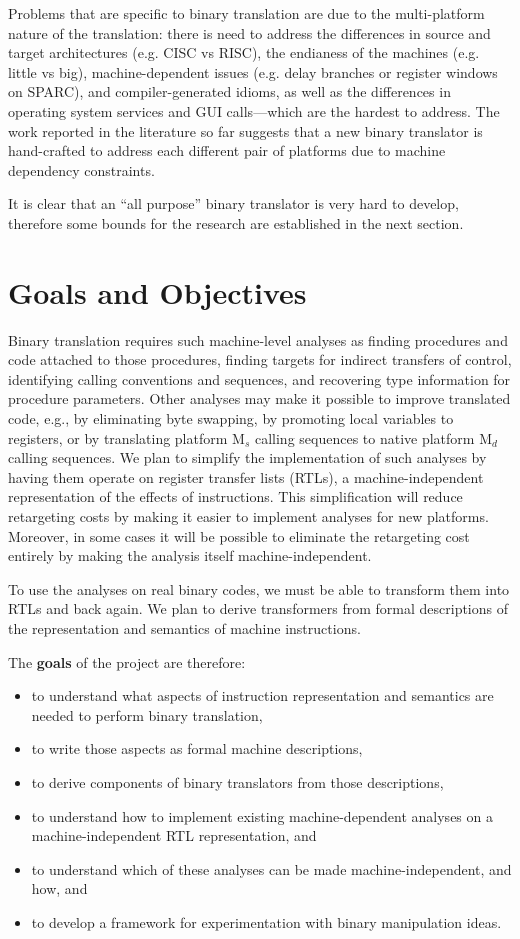 Problems that are specific to binary translation are due to the 
multi-platform nature of the translation: there is need to address
the differences in source and target architectures (e.g. CISC vs RISC),
the endianess of the machines (e.g. little vs big), machine-dependent issues
(e.g. delay branches or register windows on SPARC), and compiler-generated
idioms, as well as the differences in operating system services and
GUI calls---which are the hardest to address.  The work reported in the
literature so far suggests that a new binary translator is hand-crafted
to address each different pair of platforms due to machine dependency
constraints.

It is clear that an ``all purpose'' binary translator is very hard
to develop, therefore some bounds for the research are established 
in the next section.


\section{Goals and Objectives}
Binary translation requires such machine-level analyses as finding
procedures and code attached to those procedures, finding targets for
indirect transfers of control, identifying calling conventions and
sequences, and recovering type information for procedure parameters.
Other analyses may make it possible to improve translated code, e.g.,
by eliminating byte swapping, by promoting local variables to
registers, or by translating platform M$_s$ calling sequences to native
platform M$_d$ calling sequences.  We plan to simplify the implementation
of such analyses by having them operate on register transfer lists
(RTLs), a machine-independent representation of the effects of
instructions.  This simplification will reduce retargeting costs by
making it easier to implement analyses for new platforms.  Moreover,
in some cases it will be possible to eliminate the retargeting cost
entirely by making the analysis itself machine-independent.

To use the analyses on real binary codes, we must be able to transform 
them into RTLs and back again.  We plan to derive transformers from
formal descriptions of the representation and semantics of machine
instructions.  

The {\bf goals} of the project are therefore:
\begin{itemize}
\item to understand what aspects of instruction representation and
    semantics are needed to perform binary translation, 
\item to write those aspects as formal machine descriptions, 
\item to derive components of binary translators from those descriptions,
\item to understand how to implement existing machine-dependent analyses
    on a machine-independent RTL representation, and
\item to understand which of these analyses can be made machine-independent, 
	and how, and 
\item to develop a framework for experimentation with binary manipulation 
	ideas.
\end{itemize}

